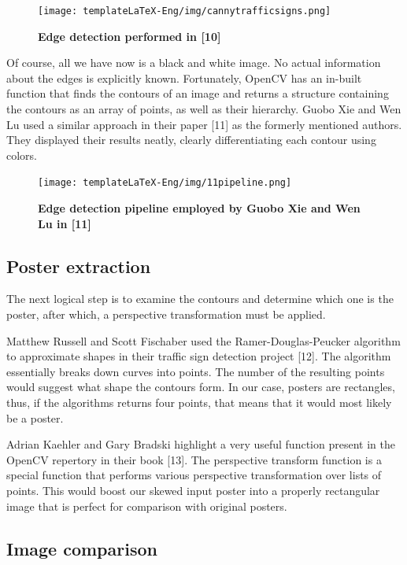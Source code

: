 \documentclass[12pt,a4paper,twoside]{report}
\begin{document}
\begin{figure}[H]
    \texttt{[image: templateLaTeX-Eng/img/cannytrafficsigns.png]}
    \caption{\bf Edge detection performed in [10]}
\end{figure}

Of course, all we have now is a black and white image. No actual information about the edges is explicitly known. Fortunately, OpenCV has an in-built function that finds the contours of an image and returns a structure containing the contours as an array of points, as well as their hierarchy. Guobo Xie and Wen Lu used a similar approach in their paper [11] as the formerly mentioned authors. They displayed their results neatly, clearly differentiating each contour using colors.

\begin{figure}[H]
    \texttt{[image: templateLaTeX-Eng/img/11pipeline.png]}
    \caption{\bf Edge detection pipeline employed by Guobo Xie and Wen Lu in [11]}
\end{figure}

\subsection{Poster extraction}

The next logical step is to examine the contours and determine which one is the poster, after which, a perspective transformation must be applied.

Matthew Russell and Scott Fischaber used the Ramer-Douglas-Peucker algorithm to approximate shapes in their traffic sign detection project [12]. The algorithm essentially breaks down curves into points. The number of the resulting points would suggest what shape the contours form. In our case, posters are rectangles, thus, if the algorithms returns four points, that means that it would most likely be a poster.

Adrian Kaehler and Gary Bradski highlight a very useful function present in the OpenCV repertory in their book [13]. The perspective transform function is a special function that performs various perspective transformation over lists of points. This would boost our skewed input poster into a properly rectangular image that is perfect for comparison with original posters.

\subsection{Image comparison}
\end{document}
